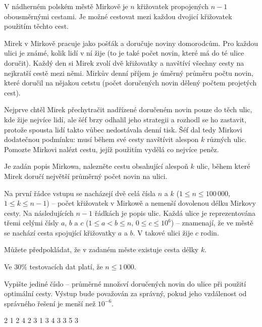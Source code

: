





V nádherném polském městě Mirkově je $n$ křižovatek propojených $n - 1$
obousměrnými cestami.
Je možné cestovat mezi každou dvojicí křižovatek použitím těchto cest.

Mirek v Mirkově pracuje jako pošťák a doručuje noviny domorodcům.
Pro každou ulici je známé, kolik lidí v ní žije
(to je také počet novin, které má do té ulice doručit).
Každý den si Mirek zvolí dvě křižovatky a navštíví všechny cesty na nejkratší
cestě mezi němi. Mirkův denní příjem je úměrný průměru počtu novin, které
doručil na nějakou cetstu
(počet doručených novin dělený počtem projetých cest).

Nejprve chtěl Mirek přechytračit nadřízené doručeném novin pouze do těch ulic,
kde žije nejvíce lidí, ale šéf brzy odhalil jeho strategii a rozhodl se ho zastavit,
protože spousta lidí takto vůbec nedostávala denní tisk.
Šéf dal tedy Mirkovi dodatečnou podmínku: musí během své cesty navštívit
alespon $k$ různých ulic.
Pomozte Mirkovi nalézt cestu, jejíž použitím vydělá co nejvíce peněz.


Je zadán popis Mirkowa, nalezněte cestu obsahující alespoň $k$ ulic,
během které Mirek doručí největší průměrný počet novin na ulici.


Na první řádce vstupu se nacházejí dvě celá čísla $n$ a $k$
($1 \le n \le 100\,000$, $1 \le k \le n - 1$)
-- počet křižovatek v Mirkowě a nemenší dovolenou délku Mirkovy cesty.
Na následujících $n-1$ řádkách je popis ulic.
Každá ulice je reprezentována třemi celými čísly $a$, $b$ a $c$
($1 \le a < b \le n$, $0 \le c \le 10^6$)
-- znamenají, že ve městě se nachází cesta spojující křižovatky $a$ a $b$. V takové ulici žije $c$ rodin.

Můžete předpokládat, že v zadaném měste existuje cesta délky $k$.

Ve $30\%$ testovacích dat platí, že  $n \le 1\,000$.


Vypište jediné číslo -- průměrné množsví doručených novin do ulice při použití
optimální cesty.
Výstup bude považován za správný, pokud jeho vzdálenost od správného řešení
je menší než $10^{-6}$.


 2
1 2 4
2 3 1
3 4 3
3 5 3
\sampleEND


